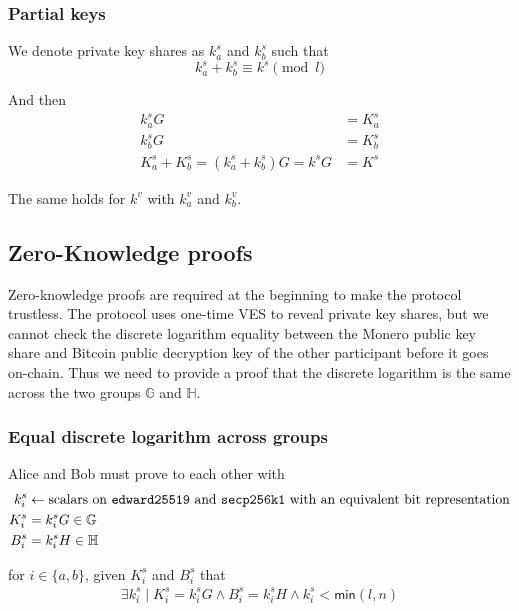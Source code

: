 \documentclass{llncs}
\newcommand{\GG}{\mathbb{G}}
\newcommand{\HH}{\mathbb{H}}
\begin{document}
\subsubsection{Partial keys}
We denote private key shares as $k^s_a$ and $k^s_b$ such that
$$k^s_a + k^s_b \equiv k^s \pmod l$$

And then
\begin{equation}
\begin{split}
    k^s_aG &= K^s_a \\
    k^s_bG &= K^s_b \\
    K^s_a + K^s_b = (k^s_a + k^s_b)G = k^sG &= K^s
\end{split}
\end{equation}

The same holds for $k^v$ with $k^v_a$ and $k^v_b$.

\subsection{Zero-Knowledge proofs}
\label{eqDiscreteLog}
Zero-knowledge proofs are required at the beginning to make the protocol trustless. The protocol uses one-time VES to reveal private key shares, but we cannot check the discrete logarithm equality between the Monero public key share and Bitcoin public decryption key of the other participant before it goes on-chain. Thus we need to provide a proof that the discrete logarithm is the same across the two groups $\GG$ and $\HH$.

\subsubsection{Equal discrete logarithm across groups}
Alice and Bob must prove to each other with
\begin{equation}
\begin{split}
    k^s_i &\leftarrow \text{scalars on \texttt{edward25519} and \texttt{secp256k1} with an equivalent bit representation} \\
    K^s_i &= k^s_iG \in \GG \\
    B^s_i &= k^s_iH \in \HH \\
\end{split}
\end{equation}

for $i \in \{a, b\}$, given $K^s_i$ and $B^s_i$ that
\begin{equation}
\begin{split}
    \exists k^s_i \mid K^s_i = k^s_iG \land B^s_i = k^s_iH \land k^s_i < \textsf{min}(l,n)
\end{split}
\end{equation}
\end{document}
